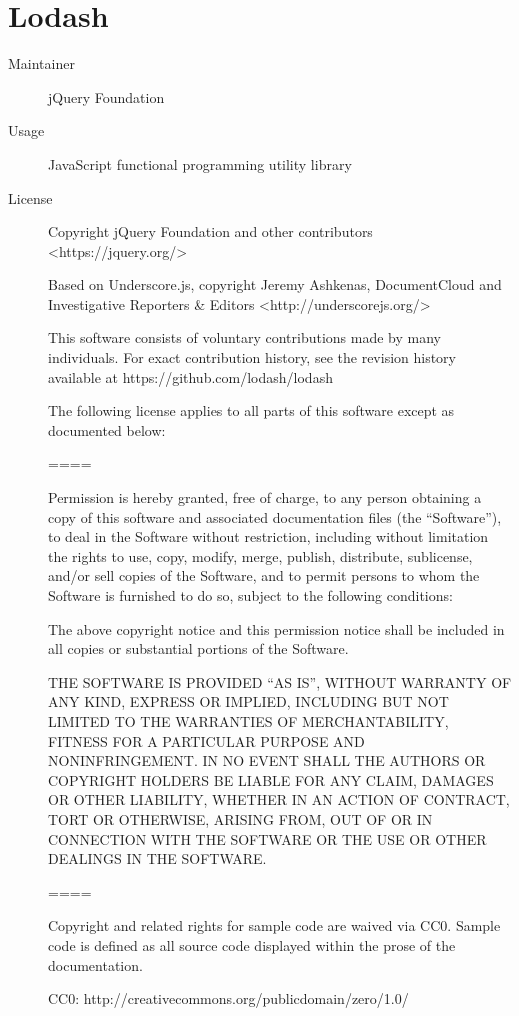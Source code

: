   \section*{Lodash}
    \begin{description}
      \item[Maintainer] jQuery Foundation
      \item[Usage] JavaScript functional programming utility library
      \item[License] \scriptsize Copyright jQuery Foundation and other contributors <https://jquery.org/>

        Based on Underscore.js, copyright Jeremy Ashkenas,
        DocumentCloud and Investigative Reporters \& Editors <http://underscorejs.org/>

        This software consists of voluntary contributions made by many
        individuals. For exact contribution history, see the revision history
        available at https://github.com/lodash/lodash

        The following license applies to all parts of this software except as
        documented below:

        ====

        Permission is hereby granted, free of charge, to any person obtaining
        a copy of this software and associated documentation files (the
        ``Software''), to deal in the Software without restriction, including
        without limitation the rights to use, copy, modify, merge, publish,
        distribute, sublicense, and/or sell copies of the Software, and to
        permit persons to whom the Software is furnished to do so, subject to
        the following conditions:

        The above copyright notice and this permission notice shall be
        included in all copies or substantial portions of the Software.

        THE SOFTWARE IS PROVIDED ``AS IS'', WITHOUT WARRANTY OF ANY KIND,
        EXPRESS OR IMPLIED, INCLUDING BUT NOT LIMITED TO THE WARRANTIES OF
        MERCHANTABILITY, FITNESS FOR A PARTICULAR PURPOSE AND
        NONINFRINGEMENT. IN NO EVENT SHALL THE AUTHORS OR COPYRIGHT HOLDERS BE
        LIABLE FOR ANY CLAIM, DAMAGES OR OTHER LIABILITY, WHETHER IN AN ACTION
        OF CONTRACT, TORT OR OTHERWISE, ARISING FROM, OUT OF OR IN CONNECTION
        WITH THE SOFTWARE OR THE USE OR OTHER DEALINGS IN THE SOFTWARE.

        ====

        Copyright and related rights for sample code are waived via CC0. Sample
        code is defined as all source code displayed within the prose of the
        documentation.

        CC0: http://creativecommons.org/publicdomain/zero/1.0/
    \end{description}

